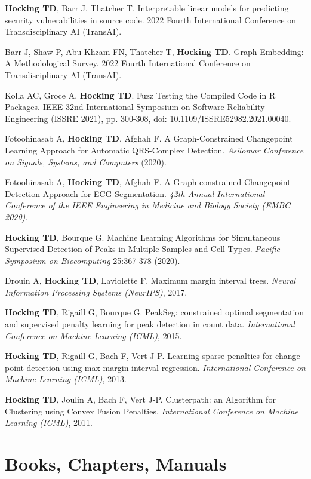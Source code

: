 \documentclass[margin,line]{res}
\begin{document}
\begin{resume}
{\bf Hocking TD}, Barr J, Thatcher T. Interpretable linear models for predicting security vulnerabilities in source code. 2022 Fourth International Conference on Transdisciplinary AI (TransAI). 

Barr J, Shaw P, Abu-Khzam FN, Thatcher T, {\bf Hocking TD}. Graph
Embedding: A Methodological Survey. 2022 Fourth International
Conference on Transdisciplinary AI (TransAI). 

Kolla AC, Groce A, {\bf Hocking TD}. Fuzz Testing the Compiled Code in
R Packages. IEEE 32nd International Symposium on Software
Reliability Engineering (ISSRE 2021), pp. 300-308, doi:
10.1109/ISSRE52982.2021.00040.

Fotoohinasab A, {\bf Hocking TD}, Afghah F. A Graph-Constrained
Changepoint Learning Approach for Automatic QRS-Complex
Detection. {\it Asilomar Conference on Signals, Systems, and
  Computers} (2020).

Fotoohinasab A, {\bf Hocking TD}, Afghah F. A Graph-constrained
Changepoint Detection Approach for ECG Segmentation. 
{\it 42th Annual International Conference of the IEEE Engineering in
  Medicine and Biology Society (EMBC 2020)}.

{\bf Hocking TD}, Bourque G. Machine Learning Algorithms for
Simultaneous Supervised Detection of Peaks in Multiple Samples and
Cell Types. {\it Pacific Symposium on Biocomputing} 25:367-378 (2020).

Drouin A, {\bf Hocking TD}, Laviolette F. Maximum margin interval
trees. {\it Neural Information Processing Systems (NeurIPS)}, 2017.

{\bf Hocking TD}, Rigaill G, Bourque G. PeakSeg: constrained optimal
segmentation and supervised penalty learning for peak detection in
count data. {\it International Conference on Machine Learning (ICML)},
2015.

{\bf Hocking TD}, Rigaill G, Bach F, Vert J-P. Learning sparse
penalties for change-point detection using max-margin interval
regression. {\it International Conference on Machine Learning (ICML)}, 2013.

{\bf Hocking TD}, Joulin A, Bach F, Vert J-P. Clusterpath: an
Algorithm for Clustering using Convex Fusion Penalties. {\it International Conference on Machine Learning (ICML)}, 2011.

\section{\sc Books, Chapters, Manuals}


\end{resume}
\end{document}
